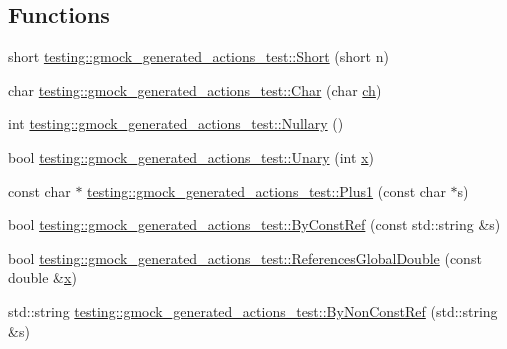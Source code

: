 \subsection*{Functions}
\begin{DoxyCompactItemize}
\item 
short \mbox{\hyperlink{namespacetesting_1_1gmock__generated__actions__test_a7c442b3594b6717b8d499781a82170b2}{testing\+::gmock\+\_\+generated\+\_\+actions\+\_\+test\+::\+Short}} (short n)
\item 
char \mbox{\hyperlink{namespacetesting_1_1gmock__generated__actions__test_aa07e216a4c9d492fb7e7c8fde949bc8f}{testing\+::gmock\+\_\+generated\+\_\+actions\+\_\+test\+::\+Char}} (char \mbox{\hyperlink{_obj__test_2lib_2googletest-master_2googlemock_2test_2gmock-matchers__test_8cc_af53f92900705f7de3c139a05b2f9ef16}{ch}})
\item 
int \mbox{\hyperlink{namespacetesting_1_1gmock__generated__actions__test_acb3d926ebbe88529c38d95f5e61573ef}{testing\+::gmock\+\_\+generated\+\_\+actions\+\_\+test\+::\+Nullary}} ()
\item 
bool \mbox{\hyperlink{namespacetesting_1_1gmock__generated__actions__test_a61f0e6c3f2c07079299f1d6e1667ab92}{testing\+::gmock\+\_\+generated\+\_\+actions\+\_\+test\+::\+Unary}} (int \mbox{\hyperlink{_obj__test_2lib_2googletest-master_2googlemock_2test_2gmock-matchers__test_8cc_a6150e0515f7202e2fb518f7206ed97dc}{x}})
\item 
const char $\ast$ \mbox{\hyperlink{namespacetesting_1_1gmock__generated__actions__test_a75e901c6d28c591c53a54320a294da55}{testing\+::gmock\+\_\+generated\+\_\+actions\+\_\+test\+::\+Plus1}} (const char $\ast$s)
\item 
bool \mbox{\hyperlink{namespacetesting_1_1gmock__generated__actions__test_aecf48d9fccd335e231a51013e61b8129}{testing\+::gmock\+\_\+generated\+\_\+actions\+\_\+test\+::\+By\+Const\+Ref}} (const std\+::string \&s)
\item 
bool \mbox{\hyperlink{namespacetesting_1_1gmock__generated__actions__test_a3e552b41de08f0516f4b0e32fed68a61}{testing\+::gmock\+\_\+generated\+\_\+actions\+\_\+test\+::\+References\+Global\+Double}} (const double \&\mbox{\hyperlink{_obj__test_2lib_2googletest-master_2googlemock_2test_2gmock-matchers__test_8cc_a6150e0515f7202e2fb518f7206ed97dc}{x}})
\item 
std\+::string \mbox{\hyperlink{namespacetesting_1_1gmock__generated__actions__test_afe690aca473d063bec7f07e48e0e418c}{testing\+::gmock\+\_\+generated\+\_\+actions\+\_\+test\+::\+By\+Non\+Const\+Ref}} (std\+::string \&s)

\end{DoxyCompactItemize}
